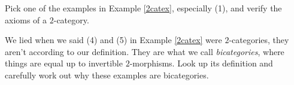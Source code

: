 \vspace*{0.1in}

\begin{problem}\label{prob A.4}
Pick one of the examples in Example \ref{2catex}, especially (1), and verify the axioms of a $2$-category.
\end{problem}

\vspace*{0.1in}

\begin{problem}\label{prob A.5}
We lied when we said (4) and (5) in Example \ref{2catex} were $2$-categories, they aren't according to our definition. They are what we call \emph{bicategories}, where things are equal up to invertible $2$-morphisms. Look up its definition and carefully work out why these examples are bicategories.
\end{problem}